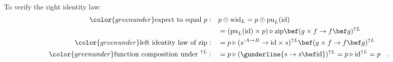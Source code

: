 To verify the right identity law:
\begin{align*}
{\color{greenunder}\text{expect to equal }p:}\quad & p\odot\text{wid}_{L}=p\odot\text{pu}_{L}(\text{id})\\
 & =(\text{pu}_{L}(\text{id})\times p)\triangleright\text{zip}\bef(g\times f\rightarrow f\bef g)^{\uparrow L}\\
{\color{greenunder}\text{left identity law of }\text{zip}:}\quad & =p\triangleright(s^{:A\rightarrow B}\rightarrow\text{id}\times s)^{\uparrow L}\bef(g\times f\rightarrow f\bef g)^{\uparrow L}\\
{\color{greenunder}\text{function composition under }^{\uparrow L}:}\quad & =p\triangleright(\gunderline{s\rightarrow s\bef\text{id}})^{\uparrow L}=p\triangleright\text{id}^{\uparrow L}=p\quad.
\end{align*}

